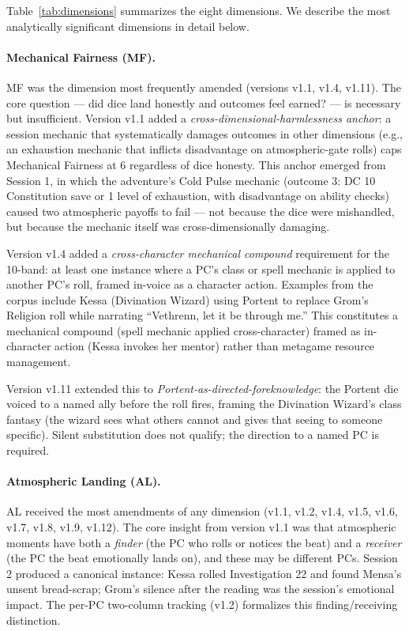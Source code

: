 Table~\ref{tab:dimensions} summarizes the eight dimensions. We describe the most
analytically significant dimensions in detail below.

\paragraph{Mechanical Fairness (MF).}
MF was the dimension most frequently amended (versions v1.1, v1.4, v1.11). The core
question --- did dice land honestly and outcomes feel earned? --- is necessary but
insufficient. Version v1.1 added a \textit{cross-dimensional-harmlessness anchor}: a
session mechanic that systematically damages outcomes in other dimensions (e.g., an
exhaustion mechanic that inflicts disadvantage on atmospheric-gate rolls) caps
Mechanical Fairness at 6 regardless of dice honesty. This anchor emerged from Session 1,
in which the adventure's Cold Pulse mechanic (outcome 3: DC 10 Constitution save or 1
level of exhaustion, with disadvantage on ability checks) caused two atmospheric payoffs
to fail --- not because the dice were mishandled, but because the mechanic itself was
cross-dimensionally damaging.

Version v1.4 added a \textit{cross-character mechanical compound} requirement for the
10-band: at least one instance where a PC's class or spell mechanic is applied to another
PC's roll, framed in-voice as a character action. Examples from the corpus include
Kessa (Divination Wizard) using Portent to replace Grom's Religion roll while narrating
``Vethrenn, let it be through me.'' This constitutes a mechanical compound (spell
mechanic applied cross-character) framed as in-character action (Kessa invokes her
mentor) rather than metagame resource management.

Version v1.11 extended this to \textit{Portent-as-directed-foreknowledge}: the Portent
die voiced to a named ally before the roll fires, framing the Divination Wizard's class
fantasy (the wizard sees what others cannot and gives that seeing to someone specific).
Silent substitution does not qualify; the direction to a named PC is required.

\paragraph{Atmospheric Landing (AL).}
AL received the most amendments of any dimension (v1.1, v1.2, v1.4, v1.5, v1.6, v1.7,
v1.8, v1.9, v1.12). The core insight from version v1.1 was that atmospheric moments
have both a \textit{finder} (the PC who rolls or notices the beat) and a
\textit{receiver} (the PC the beat emotionally lands on), and these may be different
PCs. Session 2 produced a canonical instance: Kessa rolled Investigation 22 and found
Mensa's unsent bread-scrap; Grom's silence after the reading was the session's emotional
impact. The per-PC two-column tracking (v1.2) formalizes this finding/receiving
distinction.

